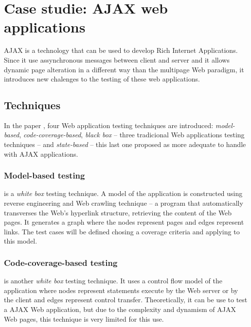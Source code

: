\documentclass[a4paper]{article}
\begin{document}
\section{Case studie: AJAX web applications \cite{mtr08}}

AJAX is a technology that can be used to develop Rich Internet Applications.
Since it use assynchronous messages between client and server and it allows dynamic page alteration in a different way than the multipage Web paradigm, it introduces new chalenges to the testing of these web applications.

\subsection{Techniques}
In the paper \cite{mtr08}, four Web application testing techniques are introduced: \emph{model-based}, \emph{code-coverage-based}, \emph{black box} -- three tradicional Web applications testing techniques -- and \emph{state-based} -- this last one proposed as more adequate to handle with AJAX applications.

\subsubsection{Model-based testing}

is a \emph{white box} testing technique.
A model of the application is constructed using reverse engineering and Web crawling technique -- a program that automatically transverses the Web's hyperlink structure, retrieving the content of the Web pages.
It generates a graph where the nodes represent pages and edges represent links.
The test cases will be defined chosing a coverage criteria and applying to this model. 

\subsubsection{Code-coverage-based testing} 

is another \emph{white box} testing technique. 
It uses a control flow model of the application where nodes represent statements execute by the Web server or by the client and edges represent control transfer.
Theoretically, it can be use to test a AJAX Web application, but due to the complexity and dynamism of AJAX Web pages, this technique is very limited for this use.
\end{document}
